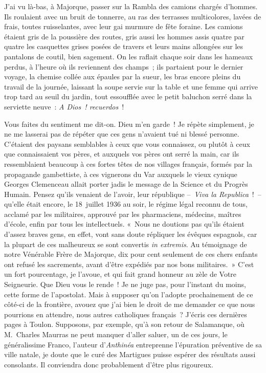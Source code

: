 \documentclass[french,twoside]{book} %
\begin{document}
\bigbreak
\noindent J’ai vu là-bas, à Majorque, passer sur la Rambla des camions chargés d’hommes. Ils roulaient avec un bruit de tonnerre, au ras des terrasses multicolores, lavées de frais, toutes ruisselantes, avec leur gai murmure de fête foraine. Les camions étaient gris de la poussière des routes, gris aussi les hommes assis quatre par quatre les casquettes grises posées de travers et leurs mains allongées sur les pantalons de coutil, bien sagement. On les raflait chaque soir dans les hameaux perdus, à l’heure où ils reviennent des champs ; ils partaient pour le dernier voyage, la chemise collée aux épaules par la sueur, les bras encore pleins du travail de la journée, laissant la soupe servie sur la table et une femme qui arrive trop tard au seuil du jardin, tout essoufflée avec le petit baluchon serré dans la serviette neuve : \emph{A Dios ! recuerdos} !\par
\bigbreak
\noindent Vous faites du sentiment me dit-on. Dieu m’en garde ! Je répète simplement, je ne me lasserai pas de répéter que ces gens n’avaient tué ni blessé personne. C’étaient des paysans semblables à ceux que vous connaissez, ou plutôt à ceux que connaissaient vos pères, et auxquels vos pères ont serré la main, car ils ressemblaient beaucoup à ces fortes têtes de nos villages français, formés par la propagande gambettiste, à ces vignerons du Var auxquels le vieux cynique Georges Clemenceau allait porter jadis le message de la Science et du Progrès Humain. Pensez qu’ils venaient de l’avoir, leur république – \emph{Viva la Republica} ! – qu’elle était encore, le 18 juillet 1936 au soir, le régime légal reconnu de tous, acclamé par les militaires, approuvé par les pharmaciens, médecins, maîtres d’école, enfin par tous les intellectuels. « Nous ne doutions pas qu’ils étaient d’assez braves gens, en effet, vont sans doute répliquer les évêques espagnols, car la plupart de ces malheureux se sont convertis \emph{in extremis}. Au témoignage de notre Vénérable Frère de Majorque, dix pour cent seulement de ces chers enfants ont refusé les sacrements, avant d’être expédiés par nos bons militaires. » C’est un fort pourcentage, je l’avoue, et qui fait grand honneur au zèle de Votre Seigneurie. Que Dieu vous le rende ! Je ne juge pas, pour l’instant du moins, cette forme de l’apostolat. Mais à supposer qu’on l’adopte prochainement de ce côté-ci de la frontière, avouez que j’ai bien le droit de me demander ce que nous pourrions en attendre, nous autres catholiques français ? J’écris ces dernières pages à Toulon. Supposons, par exemple, qu’à son retour de Salamanque, où M. Charles Maurras ne peut manquer d’aller saluer, un de ces jours, le généralissime Franco, l’auteur d’\emph{Anthinéa} entreprenne l’épuration préventive de sa ville natale, je doute que le curé des Martigues puisse espérer des résultats aussi consolants. Il conviendra donc probablement d’être plus rigoureux.\par
\end{document}
